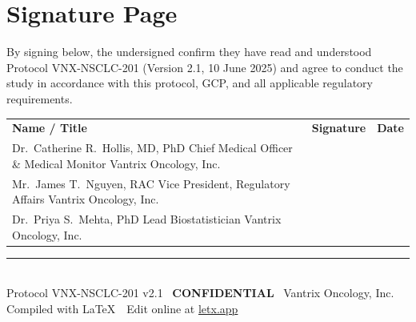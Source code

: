 \section*{Signature Page}

\vspace{0.6cm}

By signing below, the undersigned confirm they have read and understood Protocol VNX-NSCLC-201 (Version 2.1, 10 June 2025) and agree to conduct the study in accordance with this protocol, GCP, and all applicable regulatory requirements.

\vspace{1.4cm}

\begin{tabularx}{\linewidth}{@{}>{\raggedright\arraybackslash}X
  >{\centering\arraybackslash}p{4.5cm}
  >{\centering\arraybackslash}p{3.5cm}@{}}
  \textbf{Name / Title} & \textbf{Signature} & \textbf{Date} \\[18pt]
  \color{neutral}Dr.\ Catherine R.\ Hollis, MD, PhD\newline
  Chief Medical Officer \& Medical Monitor\newline
  Vantrix Oncology, Inc.
  & \hrulefill & \hrulefill \\[22pt]
  \color{neutral}Mr.\ James T.\ Nguyen, RAC\newline
  Vice President, Regulatory Affairs\newline
  Vantrix Oncology, Inc.
  & \hrulefill & \hrulefill \\[22pt]
  \color{neutral}Dr.\ Priya S.\ Mehta, PhD\newline
  Lead Biostatistician\newline
  Vantrix Oncology, Inc.
  & \hrulefill & \hrulefill \\
\end{tabularx}

\vspace{2cm}
\begin{center}
  {\color{rulegray}\rule{12cm}{0.4pt}}\\[4pt]
  {\small\color{neutral}Protocol VNX-NSCLC-201 v2.1 \textbullet\ \textbf{CONFIDENTIAL} \textbullet\ Vantrix Oncology, Inc.}\\[2pt]
  {\small\color{neutral}Compiled with \LaTeX\ \textbullet\ Edit online at \href{https://letx.app}{\textcolor{accent}{letx.app}}}
\end{center}
